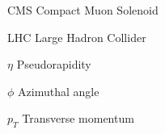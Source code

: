\begin{eqlist}

\item[CMS]
Compact Muon Solenoid

\item[LHC]
Large Hadron Collider

\item[$\eta$]
Pseudorapidity

\item[$\phi$]
Azimuthal angle

\item[$p_T$]
Transverse momentum



\end{eqlist}